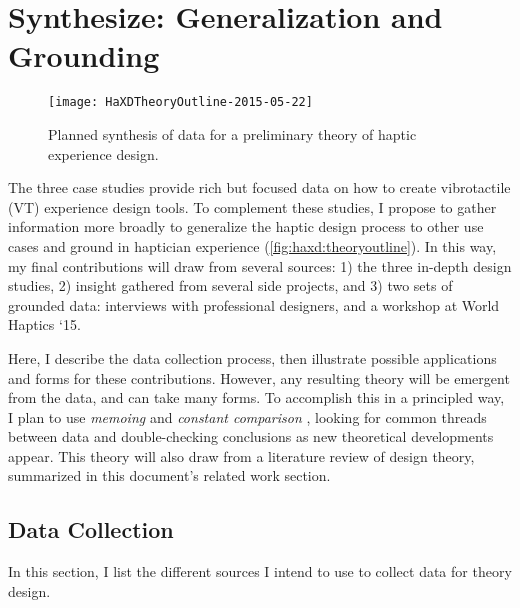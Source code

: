 
\chapter{Synthesize: Generalization and Grounding}
\label{ch:haxd}


\begin{figure}[h] %
   \centering
   \texttt{[image: HaXDTheoryOutline-2015-05-22]} 
   \caption{Planned synthesis of data for a preliminary theory of haptic experience design.}
   \label{fig:haxd:theoryoutline}
\end{figure}


The three case studies provide rich but focused data on how to create vibrotactile (VT) experience design tools.
To complement these studies, I propose to gather information more broadly to generalize the haptic design process to other use cases and ground in haptician experience (\autoref{fig:haxd:theoryoutline}).
In this way, my final contributions will draw from several sources: 
1) the three in-depth design studies,
2) insight gathered from several side projects, and
3) two sets of grounded data: interviews with professional designers, and
a workshop at World Haptics `15.

Here, I describe the data collection process, then illustrate possible applications and forms for these contributions.
However, any resulting theory will be emergent from the data, and can take many forms.
To accomplish this in a principled way, I plan to use \emph{memoing} and \emph{constant comparison} \cite{Corbin2008}, looking for common threads between data and double-checking conclusions as new theoretical developments appear.
This theory will also draw from a literature review of design theory, summarized in this document's related work section.




%
%
\section{Data Collection}
In this section, I list the different sources I intend to use to collect data for theory design.

